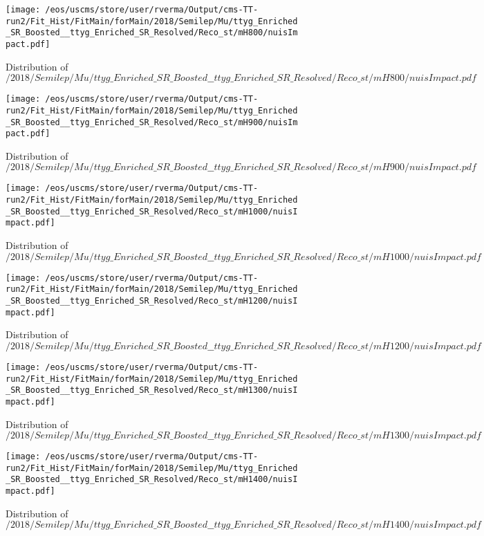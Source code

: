 \begin{figure}
\centering
\texttt{[image: /eos/uscms/store/user/rverma/Output/cms-TT-run2/Fit\_Hist/FitMain/forMain/2018/Semilep/Mu/ttyg\_Enriched\_SR\_Boosted\_\_ttyg\_Enriched\_SR\_Resolved/Reco\_st/mH800/nuisImpact.pdf]}
\caption{Distribution of $/2018/Semilep/Mu/ttyg\_Enriched\_SR\_Boosted\_\_ttyg\_Enriched\_SR\_Resolved/Reco\_st/mH800/nuisImpact.pdf$}
\end{figure}

\begin{figure}
\centering
\texttt{[image: /eos/uscms/store/user/rverma/Output/cms-TT-run2/Fit\_Hist/FitMain/forMain/2018/Semilep/Mu/ttyg\_Enriched\_SR\_Boosted\_\_ttyg\_Enriched\_SR\_Resolved/Reco\_st/mH900/nuisImpact.pdf]}
\caption{Distribution of $/2018/Semilep/Mu/ttyg\_Enriched\_SR\_Boosted\_\_ttyg\_Enriched\_SR\_Resolved/Reco\_st/mH900/nuisImpact.pdf$}
\end{figure}

\begin{figure}
\centering
\texttt{[image: /eos/uscms/store/user/rverma/Output/cms-TT-run2/Fit\_Hist/FitMain/forMain/2018/Semilep/Mu/ttyg\_Enriched\_SR\_Boosted\_\_ttyg\_Enriched\_SR\_Resolved/Reco\_st/mH1000/nuisImpact.pdf]}
\caption{Distribution of $/2018/Semilep/Mu/ttyg\_Enriched\_SR\_Boosted\_\_ttyg\_Enriched\_SR\_Resolved/Reco\_st/mH1000/nuisImpact.pdf$}
\end{figure}

\begin{figure}
\centering
\texttt{[image: /eos/uscms/store/user/rverma/Output/cms-TT-run2/Fit\_Hist/FitMain/forMain/2018/Semilep/Mu/ttyg\_Enriched\_SR\_Boosted\_\_ttyg\_Enriched\_SR\_Resolved/Reco\_st/mH1200/nuisImpact.pdf]}
\caption{Distribution of $/2018/Semilep/Mu/ttyg\_Enriched\_SR\_Boosted\_\_ttyg\_Enriched\_SR\_Resolved/Reco\_st/mH1200/nuisImpact.pdf$}
\end{figure}

\begin{figure}
\centering
\texttt{[image: /eos/uscms/store/user/rverma/Output/cms-TT-run2/Fit\_Hist/FitMain/forMain/2018/Semilep/Mu/ttyg\_Enriched\_SR\_Boosted\_\_ttyg\_Enriched\_SR\_Resolved/Reco\_st/mH1300/nuisImpact.pdf]}
\caption{Distribution of $/2018/Semilep/Mu/ttyg\_Enriched\_SR\_Boosted\_\_ttyg\_Enriched\_SR\_Resolved/Reco\_st/mH1300/nuisImpact.pdf$}
\end{figure}

\begin{figure}
\centering
\texttt{[image: /eos/uscms/store/user/rverma/Output/cms-TT-run2/Fit\_Hist/FitMain/forMain/2018/Semilep/Mu/ttyg\_Enriched\_SR\_Boosted\_\_ttyg\_Enriched\_SR\_Resolved/Reco\_st/mH1400/nuisImpact.pdf]}
\caption{Distribution of $/2018/Semilep/Mu/ttyg\_Enriched\_SR\_Boosted\_\_ttyg\_Enriched\_SR\_Resolved/Reco\_st/mH1400/nuisImpact.pdf$}
\end{figure}

